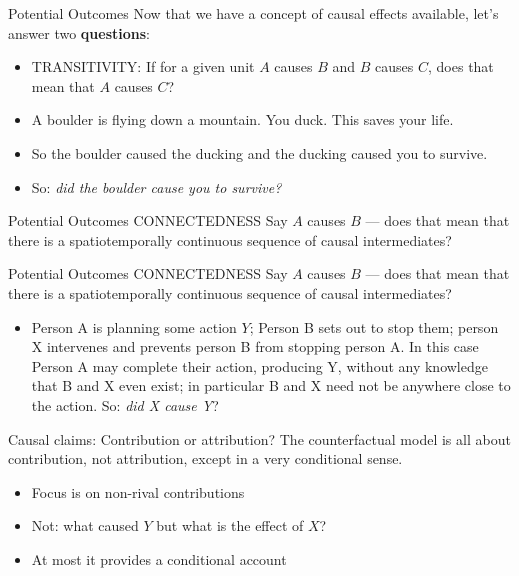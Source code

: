 \documentclass[
  11pt,
  ignorenonframetext,
]{beamer}
\providecommand{\tightlist}{%
  \setlength{\itemsep}{0pt}\setlength{\parskip}{0pt}}\usepackage{longtable,booktabs,array}
\begin{document}
\begin{frame}{Potential Outcomes}
\protect\hypertarget{potential-outcomes-3}{}
Now that we have a concept of causal effects available, let's answer two
\textbf{questions}:

\begin{itemize}
\item
  TRANSITIVITY: If for a given unit \(A\) causes \(B\) and \(B\) causes
  \(C\), does that mean that \(A\) causes \(C\)?
\item
  A boulder is flying down a mountain. You duck. This saves your life.
\item
  So the boulder caused the ducking and the ducking caused you to
  survive.
\item
  So: \emph{did the boulder cause you to survive?}
\end{itemize}
\end{frame}

\begin{frame}{Potential Outcomes}
\protect\hypertarget{potential-outcomes-4}{}
CONNECTEDNESS Say \(A\) causes \(B\) --- does that mean that there is a
spatiotemporally continuous sequence of causal intermediates?
\end{frame}

\begin{frame}{Potential Outcomes}
\protect\hypertarget{potential-outcomes-5}{}
CONNECTEDNESS Say \(A\) causes \(B\) --- does that mean that there is a
spatiotemporally continuous sequence of causal intermediates?

\begin{itemize}
\tightlist
\item
  Person A is planning some action \(Y\); Person B sets out to stop
  them; person X intervenes and prevents person B from stopping person
  A. In this case Person A may complete their action, producing Y,
  without any knowledge that B and X even exist; in particular B and X
  need not be anywhere close to the action. So: \emph{did X cause Y}?
\end{itemize}
\end{frame}

\begin{frame}{Causal claims: Contribution or attribution?}
\protect\hypertarget{causal-claims-contribution-or-attribution}{}
The counterfactual model is all about contribution, not attribution,
except in a very conditional sense.

\begin{itemize}
\tightlist
\item
  Focus is on non-rival contributions
\item
  Not: what caused \(Y\) but what is the effect of \(X\)?
\item
  At most it provides a conditional account
\end{itemize}
\end{frame}
\end{document}
